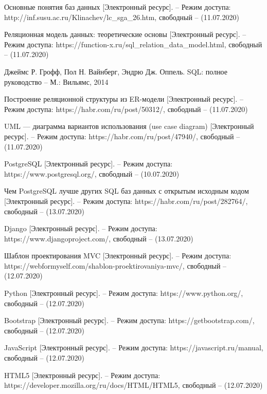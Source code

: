 \documentclass[a4paper,14pt]{extarticle}
\begin{document}
 	
 	\begin{thebibliography}{19}
 		Основные понятия баз данных [Электронный ресурс]. – Режим доступа: 
 		http://inf.susu.ac.ru/Klinachev/lc\_sga\_26.htm, 
 		свободный – (11.07.2020)
 		
 		Реляционная модель данных: теоретические основы [Электронный ресурс]. – Режим доступа: 
 		https://function-x.ru/sql\_relation\_data\_model.html, 
 		свободный – (11.07.2020)
 		
 		Джеймс Р. Грофф, Пол Н. Вайнберг, Эндрю Дж. Оппель. SQL: полное руководство – М.: Вильямс, 2014
 		
 		Построение реляционной структуры из ER-модели [Электронный ресурс]. – Режим доступа: 
 		https://habr.com/ru/post/50312/, 
 		свободный – (11.07.2020)
 		
 		UML — диаграмма вариантов использования (use case diagram) [Электронный ресурс]. – Режим доступа: 
 		https://habr.com/ru/post/47940/, 
 		свободный – (11.07.2020)
 		
 		PostgreSQL [Электронный ресурс]. – Режим доступа: 
 		https://www.postgresql.org/, 
 		свободный – (10.07.2020)
 		
 		Чем PostgreSQL лучше других SQL баз данных с открытым исходным кодом [Электронный ресурс]. – Режим доступа: 
 		https://habr.com/ru/post/282764/, 
 		свободный – (13.07.2020)
 		
 		Django [Электронный ресурс]. – Режим доступа: 
 		https://www.djangoproject.com/, 
 		свободный – (13.07.2020)
 		
 		Шаблон проектирования MVC [Электронный ресурс]. – Режим доступа: 
 		https://webformyself.com/shablon-proektirovaniya-mvc/, 
 		свободный – (12.07.2020)
 		
 		Python [Электронный ресурс]. – Режим доступа: 
 		https://www.python.org/, 
 		свободный – (12.07.2020)
 		
 		Bootstrap [Электронный ресурс]. – Режим доступа: 
 		https://getbootstrap.com/, 
 		свободный – (12.07.2020)
 		
 		JavaScript [Электронный ресурс]. – Режим доступа: 
 		https://javascript.ru/manual, 
 		свободный – (12.07.2020)
 		
 		HTML5 [Электронный ресурс]. – Режим доступа: 
 		https://developer.mozilla.org/ru/docs/HTML/HTML5, 
 		свободный – (12.07.2020)
 		

\end{thebibliography}
\end{document}
